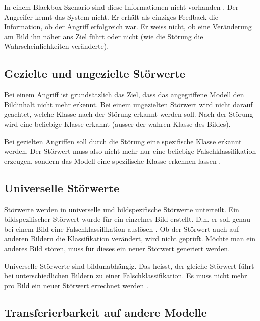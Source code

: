 \documentclass{FFHS_Thesis_Additions/ffhsthesis}
\begin{document}
In einem Blackbox-Szenario sind diese Informationen nicht vorhanden \cite{sarkar_upset_2017}. 
Der Angreifer kennt das System nicht. 
Er erhält als einziges Feedback die Information, ob der Angriff erfolgreich war.
Er weiss nicht, ob eine Veränderung am Bild ihn näher ans Ziel führt oder nicht (wie die Störung die Wahrscheinlichkeiten veränderte). 

\subsection{Gezielte und ungezielte Störwerte}

Bei einem Angriff ist grundsätzlich das Ziel, dass das angegriffene Modell den Bildinhalt nicht mehr erkennt. Bei einem ungezielten Störwert wird nicht darauf geachtet, welche Klasse nach der Störung erkannt werden soll. Nach der Störung wird eine beliebige Klasse erkannt (ausser der wahren Klasse des Bildes).

Bei gezielten Angriffen soll durch die Störung eine spezifische Klasse erkannt werden.
Der Störwert muss also nicht mehr nur eine beliebige Falschklassifikation erzeugen, sondern das Modell eine spezifische Klasse erkennen lassen \cite{yuan_adversarial_2019}.

\subsection{Universelle Störwerte}

Störwerte werden in universelle und bildspezifische Störwerte unterteilt. 
Ein bildspezifischer Störwert wurde für ein einzelnes Bild erstellt. 
D.h. er soll genau bei einem Bild eine Falschklassifikation auslösen \cite{moosavi-dezfooli_deepfool_2016}. 
Ob der Störwert auch auf anderen Bildern die Klassifikation verändert, wird nicht geprüft. Möchte man ein anderes Bild stören, muss für dieses ein neuer Störwert generiert werden.

Universelle Störwerte sind bildunabhängig. Das heisst, der gleiche Störwert führt bei unterschiedlichen Bildern zu einer Falschklassifikation. Es muss nicht mehr pro Bild ein neuer Störwert errechnet werden \cite{moosavi-dezfooli_universal_2017-1, sarkar_upset_2017}. 




\subsection{Transferierbarkeit auf andere Modelle}
\end{document}

